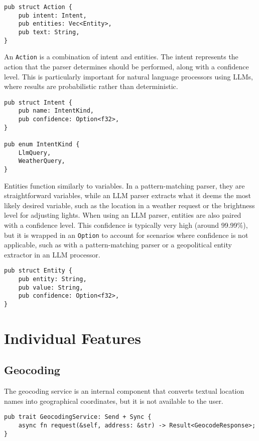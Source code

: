 \begin{verbatim}
pub struct Action {
    pub intent: Intent,
    pub entities: Vec<Entity>,
    pub text: String,
}
\end{verbatim}

An \texttt{Action} is a combination of intent and entities.
The intent represents the action that the parser determines should be performed, along with a confidence level.
This is particularly important for natural language processors using LLMs, where results are probabilistic rather than deterministic.

\begin{verbatim}
pub struct Intent {
    pub name: IntentKind,
    pub confidence: Option<f32>,
}

pub enum IntentKind {
    LlmQuery,
    WeatherQuery,
}
\end{verbatim}

Entities function similarly to variables. In a pattern-matching parser, they are straightforward variables,
while an LLM parser extracts what it deems the most likely desired variable,
such as the location in a weather request or the brightness level for adjusting lights.
When using an LLM parser, entities are also paired with a confidence level.
This confidence is typically very high (around 99.99\%), but it is wrapped in an \texttt{Option}
to account for scenarios where confidence is not applicable,
such as with a pattern-matching parser or a geopolitical entity extractor in an LLM processor.

\begin{verbatim}
pub struct Entity {
    pub entity: String,
    pub value: String,
    pub confidence: Option<f32>,
}
\end{verbatim}

\section{Individual Features}

\subsection{Geocoding}
The geocoding service is an internal component that converts textual location names into geographical coordinates, but it is not available to the user.

\begin{verbatim}
pub trait GeocodingService: Send + Sync {
    async fn request(&self, address: &str) -> Result<GeocodeResponse>;
}
\end{verbatim}

